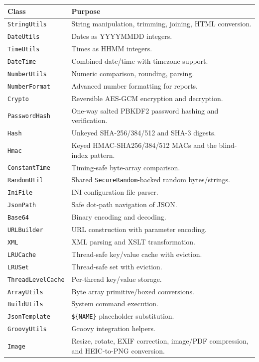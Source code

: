 \begin{longtable}{P{3.6cm}P{6.9cm}}
\toprule
\textbf{Class} & \textbf{Purpose} \\
\midrule
\endhead
\texttt{StringUtils} & String manipulation, trimming, joining, HTML conversion. \\
\texttt{DateUtils} & Dates as YYYYMMDD integers. \\
\texttt{TimeUtils} & Times as HHMM integers. \\
\texttt{DateTime} & Combined date/time with timezone support. \\
\texttt{NumberUtils} & Numeric comparison, rounding, parsing. \\
\texttt{NumberFormat} & Advanced number formatting for reports. \\
\texttt{Crypto} & Reversible AES-GCM encryption and decryption. \\
\texttt{PasswordHash} & One-way salted PBKDF2 password hashing and verification. \\
\texttt{Hash} & Unkeyed SHA-256/384/512 and SHA-3 digests. \\
\texttt{Hmac} & Keyed HMAC-SHA256/384/512 MACs and the blind-index pattern. \\
\texttt{ConstantTime} & Timing-safe byte-array comparison. \\
\texttt{RandomUtil} & Shared \texttt{SecureRandom}-backed random bytes/strings. \\
\texttt{IniFile} & INI configuration file parser. \\
\texttt{JsonPath} & Safe dot-path navigation of JSON. \\
\texttt{Base64} & Binary encoding and decoding. \\
\texttt{URLBuilder} & URL construction with parameter encoding. \\
\texttt{XML} & XML parsing and XSLT transformation. \\
\texttt{LRUCache} & Thread-safe key/value cache with eviction. \\
\texttt{LRUSet} & Thread-safe set with eviction. \\
\texttt{ThreadLevelCache} & Per-thread key/value storage. \\
\texttt{ArrayUtils} & Byte array primitive/boxed conversions. \\
\texttt{BuildUtils} & System command execution. \\
\texttt{JsonTemplate} & \texttt{\$\{NAME\}} placeholder substitution. \\
\texttt{GroovyUtils} & Groovy integration helpers. \\
\texttt{Image} & Resize, rotate, EXIF correction, image/PDF compression, and HEIC-to-PNG conversion. \\
\bottomrule
\end{longtable}
